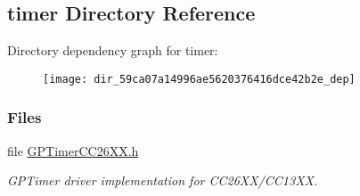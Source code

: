 \subsection{timer Directory Reference}
\label{dir_59ca07a14996ae5620376416dce42b2e}
Directory dependency graph for timer\+:
\nopagebreak
\begin{figure}[H]
\begin{center}
\leavevmode
\texttt{[image: dir\_59ca07a14996ae5620376416dce42b2e\_dep]}
\end{center}
\end{figure}
\subsubsection*{Files}
\begin{DoxyCompactItemize}
\item 
file \hyperlink{_g_p_timer_c_c26_x_x_8h}{G\+P\+Timer\+C\+C26\+X\+X.\+h}
\begin{DoxyCompactList}\small\item\em G\+P\+Timer driver implementation for C\+C26\+X\+X/\+C\+C13\+X\+X. \end{DoxyCompactList}\end{DoxyCompactItemize}
